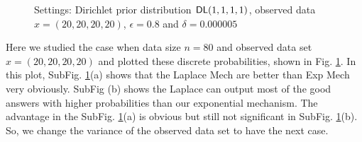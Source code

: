 \begin{figure}
\begin{center}
\centering
\caption{Settings: Dirichlet prior distribution $\mathsf{DL}(1,1,1,1)$, observed data $x = (20,20,20,20) $, $\epsilon = 0.8$ and $\delta = 0.000005$}
\label{fig_theory_20_20_20_20}
\end{center}
\end{figure}

Here we studied the case when data size $n = 80$ and observed data set $x=(20,20,20,20)$ and plotted these discrete probabilities, shown in Fig. \ref{fig_theory_20_20_20_20}.  In this plot, SubFig. \ref{fig_theory_20_20_20_20}(a) shows that the Laplace Mech are better than Exp Mech very obviously. SubFig (b) shows the Laplace can output most of the good answers with higher probabilities than our exponential mechanism. The advantage in the SubFig. \ref{fig_theory_20_20_20_20}(a) is obvious but still not significant in SubFig. \ref{fig_theory_20_20_20_20}(b). So, we change the variance of the observed data set to have the next case.

